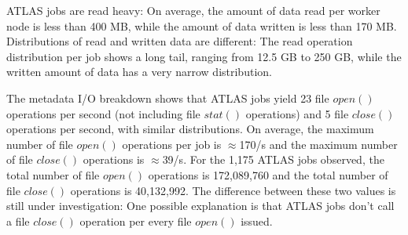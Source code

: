 
ATLAS jobs are read heavy: On average, the amount of data read per worker node
is less than 400 MB, while the amount of data written is less than 170 MB.
Distributions of read and written data are different: The read operation
distribution per job shows a long tail, ranging from 12.5 GB to 250 GB, while
the written amount of data has a very narrow distribution.


%

The metadata I/O breakdown shows that ATLAS jobs yield 23 file $open()$
operations per second (not including file $stat()$ operations) and 5 file
$close()$ operations per second, with similar distributions. On average, the
maximum number of file $open()$ operations per job is $\approx$170/s and the
maximum number of file $close()$ operations is $\approx$39/s. For the 1,175
ATLAS jobs observed, the total number of file $open()$ operations is 172,089,760
and the total number of file $close()$ operations is 40,132,992. The difference
between these two values is still under investigation: One possible explanation
is that ATLAS jobs don't call a file $close()$ operation per every file $open()$
issued.

